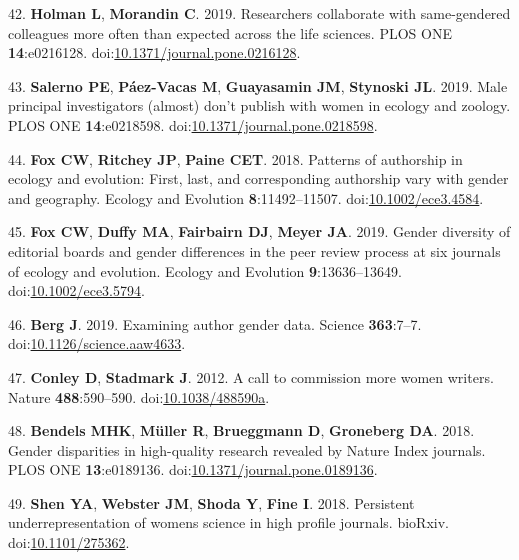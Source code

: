 \documentclass[11pt,]{article}
\begin{document}
\hypertarget{ref-holman_researchers_2019}{}
42. \textbf{Holman L}, \textbf{Morandin C}. 2019. Researchers
collaborate with same-gendered colleagues more often than expected
across the life sciences. PLOS ONE \textbf{14}:e0216128.
doi:\href{https://doi.org/10.1371/journal.pone.0216128}{10.1371/journal.pone.0216128}.

\hypertarget{ref-Salerno2019}{}
43. \textbf{Salerno PE}, \textbf{Páez-Vacas M}, \textbf{Guayasamin JM},
\textbf{Stynoski JL}. 2019. Male principal investigators (almost) don't
publish with women in ecology and zoology. PLOS ONE
\textbf{14}:e0218598.
doi:\href{https://doi.org/10.1371/journal.pone.0218598}{10.1371/journal.pone.0218598}.

\hypertarget{ref-Fox2018}{}
44. \textbf{Fox CW}, \textbf{Ritchey JP}, \textbf{Paine CET}. 2018.
Patterns of authorship in ecology and evolution: First, last, and
corresponding authorship vary with gender and geography. Ecology and
Evolution \textbf{8}:11492--11507.
doi:\href{https://doi.org/10.1002/ece3.4584}{10.1002/ece3.4584}.

\hypertarget{ref-Fox2019}{}
45. \textbf{Fox CW}, \textbf{Duffy MA}, \textbf{Fairbairn DJ},
\textbf{Meyer JA}. 2019. Gender diversity of editorial boards and gender
differences in the peer review process at six journals of ecology and
evolution. Ecology and Evolution \textbf{9}:13636--13649.
doi:\href{https://doi.org/10.1002/ece3.5794}{10.1002/ece3.5794}.

\hypertarget{ref-berg_examining_2019}{}
46. \textbf{Berg J}. 2019. Examining author gender data. Science
\textbf{363}:7--7.
doi:\href{https://doi.org/10.1126/science.aaw4633}{10.1126/science.aaw4633}.

\hypertarget{ref-conley_call_2012-1}{}
47. \textbf{Conley D}, \textbf{Stadmark J}. 2012. A call to commission
more women writers. Nature \textbf{488}:590--590.
doi:\href{https://doi.org/10.1038/488590a}{10.1038/488590a}.

\hypertarget{ref-bendels_gender_2018}{}
48. \textbf{Bendels MHK}, \textbf{Müller R}, \textbf{Brueggmann D},
\textbf{Groneberg DA}. 2018. Gender disparities in high-quality research
revealed by Nature Index journals. PLOS ONE \textbf{13}:e0189136.
doi:\href{https://doi.org/10.1371/journal.pone.0189136}{10.1371/journal.pone.0189136}.

\hypertarget{ref-Shen275362}{}
49. \textbf{Shen YA}, \textbf{Webster JM}, \textbf{Shoda Y},
\textbf{Fine I}. 2018. Persistent underrepresentation of womens science
in high profile journals. bioRxiv.
doi:\href{https://doi.org/10.1101/275362}{10.1101/275362}.
\end{document}
